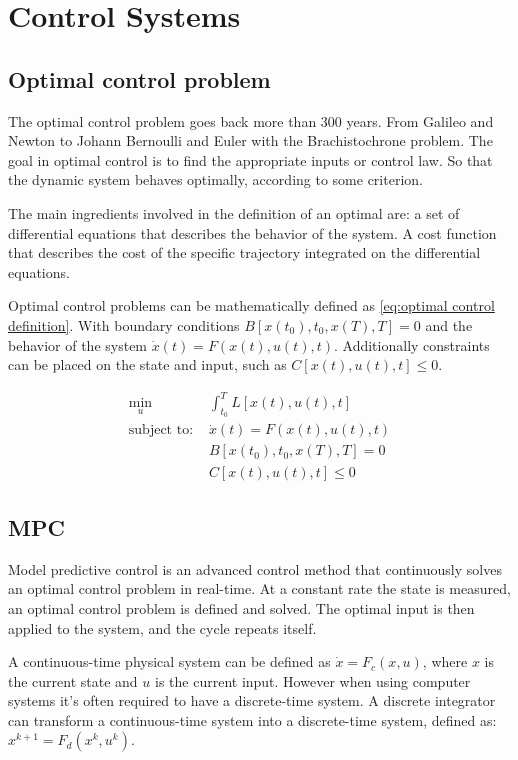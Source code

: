 \chapter{Control Systems}
\section{Optimal control problem}
	The optimal control problem goes back more than 300 years. From Galileo and Newton to Johann Bernoulli and Euler with the Brachistochrone problem. The goal in optimal control is to find the appropriate inputs or control law. So that the dynamic system behaves optimally, according to some criterion. 
	
	The main ingredients involved in the definition of an optimal are: a set of differential equations that describes the behavior of the system. A cost function that describes the cost of the specific trajectory integrated on the differential equations.
	
	Optimal control problems can be mathematically defined as \eqref{eq:optimal control definition}. With boundary conditions $B[x(t_0),t_0,x(T),T]=0$ and the behavior of the system $ \dot{x}(t) = F(x(t),u(t),t)$. Additionally constraints can be placed on the state and input, such as $C[x(t),u(t),t]\le 0$. 
	
	\begin{equation}
		\begin{aligned}
			\min_u \ & \int_{t_0}^{T} L[x(t),u(t),t] \\ 
			\text{subject to: } & \dot{x}(t) = F(x(t),u(t),t) \\
			& B[x(t_0),t_0,x(T),T]=0 \\
			& C[x(t),u(t),t]\le 0
		\end{aligned}
		\label{eq:optimal control definition}
	\end{equation}

\section{MPC}
	Model predictive control is an advanced control method that continuously solves an  optimal control problem in real-time. At a constant rate the state is measured, an optimal control problem is defined and solved. The  optimal input is then applied to the system, and the cycle repeats itself.
	
	A continuous-time physical system can be defined as $\dot{x}=F_c(x,u)$, where $x$ is the current state and $u$ is the current input. However when using computer systems it's often required to have a discrete-time system. A discrete integrator can transform a continuous-time system into a discrete-time system, defined as: $x^{k+1}=F_d(x^{k},u^{k})$. 
	
